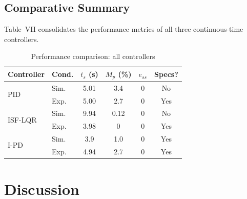 \documentclass[conference]{IEEEtran}
\begin{document}
\subsection{Comparative Summary}
Table~VII consolidates the performance metrics of all
three continuous-time controllers.
\begin{table}[h]
\centering
\caption{Performance comparison: all controllers}
\begin{tabular}{llcccc}
\toprule
Controller & Cond. & $t_s$ (s) & $M_p$ (\%) 
           & $e_{ss}$ & Specs? \\
\midrule
\multirow{2}{*}{PID}
  & Sim. & 5.01 & 3.4 & 0 & No  \\
  & Exp. & 5.00 & 2.7 & 0 & Yes \\
\midrule
\multirow{2}{*}{ISF-LQR}
  & Sim. & 9.94 & 0.12 & 0 & No  \\
  & Exp. & 3.98 & 0    & 0 & Yes \\
\midrule
\multirow{2}{*}{I-PD}
  & Sim. & 3.9  & 1.0  & 0 & Yes \\
  & Exp. & 4.94 & 2.7  & 0 & Yes \\
\bottomrule
\end{tabular}
\label{tab:comparison}
\end{table}

\section{Discussion}
\label{sec:disc}
\end{document}

